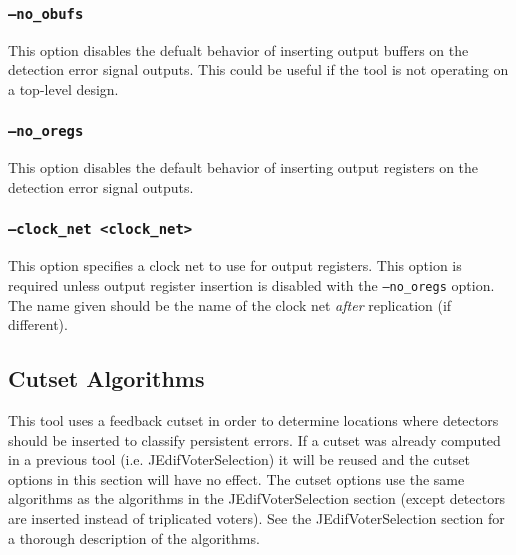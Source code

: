 \subsubsection{\texttt{--no\_obufs}}
This option disables the defualt behavior of inserting output buffers on the
detection error signal outputs. This could be useful if the tool is not
operating on a top-level design.

\subsubsection{\texttt{--no\_oregs}}
This option disables the default behavior of inserting output registers on the
detection error signal outputs.

\subsubsection{\texttt{--clock\_net <clock\_net>}}
This option specifies a clock net to use for output registers. This option is
required unless output register insertion is disabled with the
\texttt{--no\_oregs} option. The name given should be the name of the clock net
\emph{after} replication (if different).

\subsection{Cutset Algorithms}
This tool uses a feedback cutset in order to determine locations where
detectors should be inserted to classify persistent errors. If a cutset was
already computed in a previous tool (i.e. JEdifVoterSelection) it will be
reused and the cutset options in this section will have no effect. The cutset
options use the same algorithms as the algorithms in the JEdifVoterSelection
section (except detectors are inserted instead of triplicated voters). See
the JEdifVoterSelection section for a thorough description of the algorithms.





